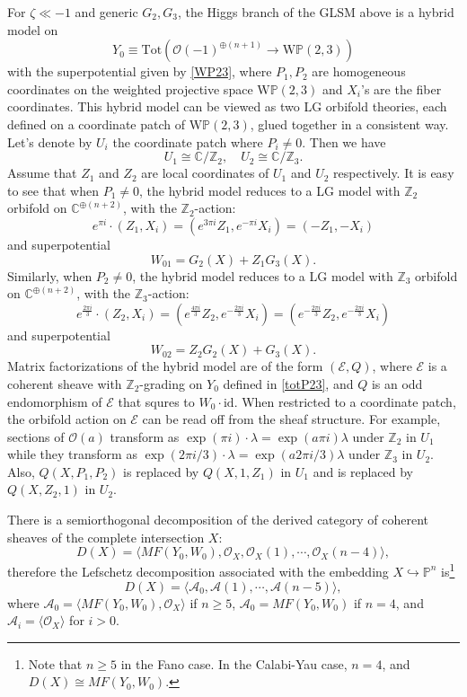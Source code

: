 \documentclass[a4paper,11pt]{article}
\numberwithin{equation}{section}
\begin{document}
For $\zeta \ll -1$ and generic $G_2, G_3$, the Higgs branch of the GLSM above is a hybrid model on
\begin{equation}\label{totP23}
Y_0 \equiv \mathrm{Tot} \left( \mathcal{O}(-1)^{\oplus (n+1)} \rightarrow \mathrm{W}\mathbb{P}(2,3) \right)
\end{equation}
with the superpotential given by \eqref{WP23}, where $P_1, P_2$ are homogeneous 
coordinates on the weighted projective space $\mathrm{W}\mathbb{P}(2,3)$ and 
$X_i$'s are the fiber coordinates. This hybrid model can be viewed as two LG 
orbifold theories, each defined on a coordinate patch of 
$\mathrm{W}\mathbb{P}(2,3)$, glued together in a consistent way. Let's denote by 
$U_i$ the coordinate patch where $P_i \neq 0$. Then we have
\[
U_1 \cong \mathbb{C} / \mathbb{Z}_2, \quad U_2 \cong \mathbb{C} / \mathbb{Z}_3.
\]
Assume that $Z_1$ and $Z_2$ are local coordinates of $U_1$ and $U_2$ respectively. It is easy to see that when $P_1 \neq 0$, the hybrid model reduces to a LG model with $\mathbb{Z}_2$ orbifold on $\mathbb{C}^{\oplus(n+2)}$, with the $\mathbb{Z}_2$-action:
\[
e^{\pi i} \cdot (Z_1, X_i) = (e^{3 \pi i} Z_1, e^{-\pi i} X_i) = (-Z_1, -X_i) 
\]
and superpotential
\[
W_{01} = G_2(X) + Z_1 G_3(X).
\]
Similarly, when $P_2 \neq 0$, the hybrid model reduces to a LG model with $\mathbb{Z}_3$ orbifold on $\mathbb{C}^{\oplus(n+2)}$, with the $\mathbb{Z}_3$-action:
\[
e^{\frac{2 \pi i}{3}} \cdot (Z_2, X_i) = (e^{\frac{4 \pi i}{3}} Z_2, e^{-\frac{2 \pi i}{3}} X_i) = (e^{-\frac{2 \pi i}{3}} Z_2, e^{-\frac{2 \pi i}{3}} X_i) 
\]
and superpotential
\[
W_{02} = Z_2 G_2(X) + G_3(X).
\]
Matrix factorizations of the hybrid model are of the form $(\mathcal{E},Q)$, where $\mathcal{E}$ is a coherent sheave with $\mathbb{Z}_2$-grading on $Y_0$ defined in \eqref{totP23}, and $Q$ is an odd endomorphism of $\mathcal{E}$ that squres to $W_0 \cdot \mathrm{id}$. When restricted to a coordinate patch, the orbifold action on $\mathcal{E}$ can be read off from the sheaf structure. For example, sections of $\mathcal{O}(a)$ transform as $\exp(\pi i) \cdot \lambda = \exp(a \pi i) \lambda$ under $\mathbb{Z}_2$ in $U_1$ while they transform as $\exp(2 \pi i/3) \cdot \lambda = \exp(a 2 \pi i/3) \lambda$ under $\mathbb{Z}_3$ in $U_2$. Also, $Q(X,P_1,P_2)$ is replaced by $Q(X,1,Z_1)$ in $U_1$ and is replaced by $Q(X,Z_2,1)$ in $U_2$.

There is a semiorthogonal decomposition of the derived category of coherent sheaves of the complete intersection $X$:
\[
D(X) = \langle MF(Y_0,W_0), \mathcal{O}_X, \mathcal{O}_X(1),\cdots, \mathcal{O}_X(n-4) \rangle,
\]
therefore the Lefschetz decomposition associated with the embedding $X \hookrightarrow \mathbb{P}^n$ is\footnote{Note that $n \ge 5$ in the Fano case. In the Calabi-Yau case, $n = 4$, and $D(X) \cong MF(Y_0,W_0)$.}
\begin{equation}\label{Lef23}
D(X) = \langle \mathcal{A}_0, \mathcal{A}(1), \cdots, \mathcal{A}(n-5) \rangle,
\end{equation}
where $\mathcal{A}_0 = \langle MF(Y_0,W_0), \mathcal{O}_X \rangle$ if $n \geq 5$, $\mathcal{A}_0 = MF(Y_0,W_0)$ if $n =4$, and $\mathcal{A}_i = \langle \mathcal{O}_X \rangle$ for $i > 0$.
\end{document}
